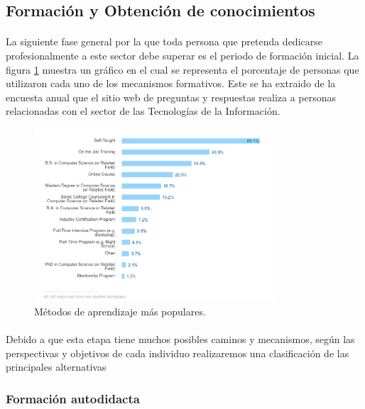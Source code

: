 \documentclass[12pt, a4paper]{report}
\begin{document}
 
        \subsection{Formación y Obtención de conocimientos}
        
        	\paragraph{}
            La siguiente fase general por la que toda persona que pretenda dedicarse profesionalmente a este sector debe superar es el periodo de formación inicial. La figura \ref{fig:education} muestra un gráfico en el cual se representa el porcentaje de personas que utilizaron cada uno de los mecanismos formativos. Este se ha extraido de la encuesta anual que el sitio web de preguntas y respuestas realiza a personas relacionadas con el sector de las Tecnologías de la Información.
            
             \begin{figure}[htb]
				\centering
				\includegraphics[width=0.8\textwidth]{images/stackoverflow-education}
				\caption{Métodos de aprendizaje más populares.\cite{stackoverflow:survey}} 		
                \label{fig:education}
			\end{figure}  
            
            \paragraph{}
            Debido a que esta etapa tiene muchos posibles caminos y mecanismos, según las perspectivas y objetivos de cada individuo realizaremos una clasificación de las principales alternativas 
            
			\subsubsection{Formación autodidacta}
        		
\end{document}
